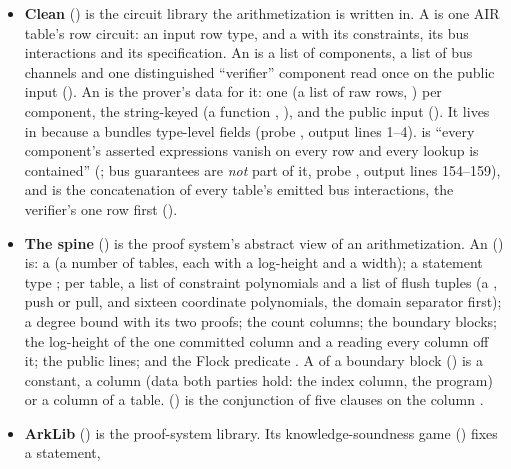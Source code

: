 \begin{itemize}
\item \textbf{Clean} () is the circuit library the arithmetization is written in.
  A  is one AIR table's row circuit: an input row type, and a
   with its constraints, its bus interactions and its specification.
  An  is a list of components, a list of bus channels and one
  distinguished \enquote{verifier} component read once on the public input
  (). An  is the prover's data for it:
  one  (a list of raw rows, ) per component, the string-keyed
   (a function ,
  ), and the public input (). It lives
  in  because a  bundles type-level fields (probe ,
  output lines 1--4).  is \enquote{every component's asserted expressions
  vanish on every row and every lookup is contained} (; bus
  guarantees are \emph{not} part of it, probe , output lines 154--159), and
   is the concatenation of every table's emitted bus interactions, the
  verifier's one row first ().
\item \textbf{The spine} () is the proof system's
  abstract view of an arithmetization. An  () is: a 
  (a number of tables, each with a log-height  and a width); a statement type
  ; per table, a list of constraint polynomials and a list of flush tuples (a
  , push or pull, and sixteen coordinate polynomials, the domain separator first); a
  degree bound  with its two proofs; the count columns; the boundary blocks; the
  log-height  of the one committed column and a  reading every column off
  it; the public lines; and the Flock predicate . A  of a boundary block
  () is a constant, a  column (data both parties hold: the index column,
  the program) or a  column of a table. 
  () is the conjunction of five clauses on the column .
\item \textbf{ArkLib} () is the proof-system library. Its knowledge-soundness game
   () fixes a statement,

\end{itemize}

